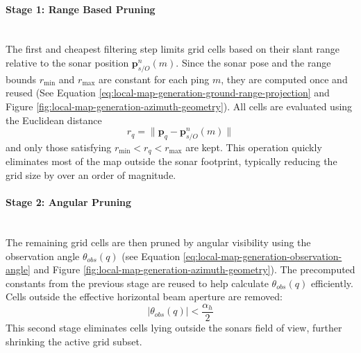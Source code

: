 \paragraph{Stage 1: Range Based Pruning} \mbox{}\\[0.5em] \noindent
The first and cheapest filtering step limits grid cells based on their slant range relative to the sonar position $\mathbf{p}_{s/O}^{n}(m)$. Since the sonar pose and the range bounds $r_{\min}$ and $r_{\max}$ are constant for each ping $m$, they are computed once and reused (See Equation \ref{eq:local-map-generation-ground-range-projection} and Figure \ref{fig:local-map-generation-azimuth-geometry}). All cells are evaluated using the Euclidean distance
$$
    r_q = \| \mathbf{p}_q - \mathbf{p}_{s/O}^{n}(m) \|
$$
and only those satisfying $r_{\min} < r_q < r_{\max}$ are kept. This operation quickly eliminates most of the map outside the sonar footprint, typically reducing the grid size by over an order of magnitude.

\paragraph{Stage 2: Angular Pruning} \mbox{}\\[0.5em] \noindent
The remaining grid cells are then pruned by angular visibility using the observation angle $\theta_{obs}(q)$ (see Equation \ref{eq:local-map-generation-observation-angle} and Figure \ref{fig:local-map-generation-azimuth-geometry}). The precomputed constants from the previous stage are reused to help calculate $\theta_{obs}(q)$ efficiently. Cells outside the effective horizontal beam aperture are removed:
$$
    |\theta_{obs}(q)| < \frac{\alpha_h}{2}
$$
This second stage eliminates cells lying outside the sonars field of view, further shrinking the active grid subset.

